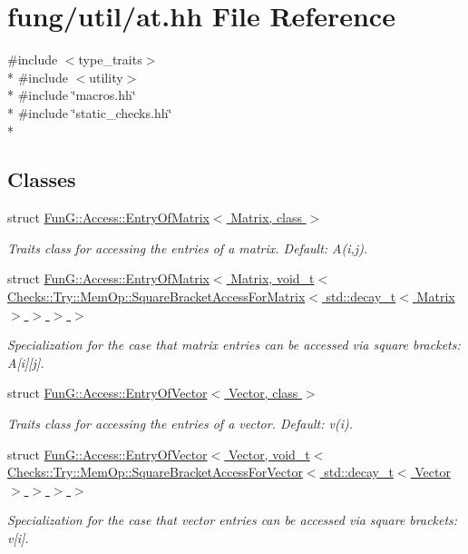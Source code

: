 \hypertarget{at_8hh}{}\section{fung/util/at.hh File Reference}
\label{at_8hh}
{\ttfamily \#include $<$type\+\_\+traits$>$}\\*
{\ttfamily \#include $<$utility$>$}\\*
{\ttfamily \#include \char`\"{}macros.\+hh\char`\"{}}\\*
{\ttfamily \#include \char`\"{}static\+\_\+checks.\+hh\char`\"{}}\\*
\subsection*{Classes}
\begin{DoxyCompactItemize}
\item 
struct \hyperlink{structFunG_1_1Access_1_1EntryOfMatrix}{Fun\+G\+::\+Access\+::\+Entry\+Of\+Matrix$<$ Matrix, class $>$}
\begin{DoxyCompactList}\small\item\em Traits class for accessing the entries of a matrix. Default\+: A(i,j). \end{DoxyCompactList}\item 
struct \hyperlink{structFunG_1_1Access_1_1EntryOfMatrix_3_01Matrix_00_01void__t_3_01Checks_1_1Try_1_1MemOp_1_1Squa64f8314119f1d5e2cd3b3016365cec8d}{Fun\+G\+::\+Access\+::\+Entry\+Of\+Matrix$<$ Matrix, void\+\_\+t$<$ Checks\+::\+Try\+::\+Mem\+Op\+::\+Square\+Bracket\+Access\+For\+Matrix$<$ std\+::decay\+\_\+t$<$ Matrix $>$ $>$ $>$ $>$}
\begin{DoxyCompactList}\small\item\em Specialization for the case that matrix entries can be accessed via square brackets\+: A\mbox{[}i\mbox{]}\mbox{[}j\mbox{]}. \end{DoxyCompactList}\item 
struct \hyperlink{structFunG_1_1Access_1_1EntryOfVector}{Fun\+G\+::\+Access\+::\+Entry\+Of\+Vector$<$ Vector, class $>$}
\begin{DoxyCompactList}\small\item\em Traits class for accessing the entries of a vector. Default\+: v(i). \end{DoxyCompactList}\item 
struct \hyperlink{structFunG_1_1Access_1_1EntryOfVector_3_01Vector_00_01void__t_3_01Checks_1_1Try_1_1MemOp_1_1Squaa9733f1e90025a89b1e2cfa7d151d247}{Fun\+G\+::\+Access\+::\+Entry\+Of\+Vector$<$ Vector, void\+\_\+t$<$ Checks\+::\+Try\+::\+Mem\+Op\+::\+Square\+Bracket\+Access\+For\+Vector$<$ std\+::decay\+\_\+t$<$ Vector $>$ $>$ $>$ $>$}
\begin{DoxyCompactList}\small\item\em Specialization for the case that vector entries can be accessed via square brackets\+: v\mbox{[}i\mbox{]}. \end{DoxyCompactList}\end{DoxyCompactItemize}
